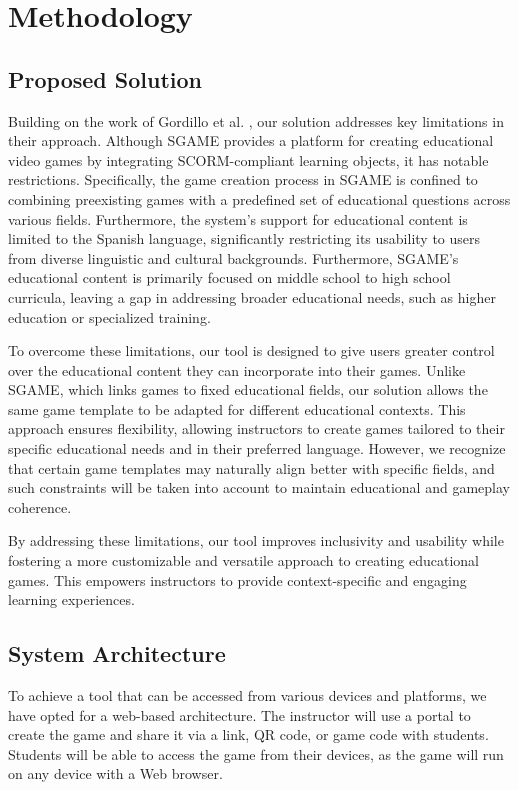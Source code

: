 \chapter{Methodology}\label{chap:method}

\section{Proposed Solution}

Building on the work of Gordillo et al. \cite{sgame2020}, our solution addresses key limitations in their approach. Although SGAME provides a platform for creating educational video games by integrating SCORM-compliant learning objects, it has notable restrictions. Specifically, the game creation process in SGAME is confined to combining preexisting games with a predefined set of educational questions across various fields. Furthermore, the system's support for educational content is limited to the Spanish language, significantly restricting its usability to users from diverse linguistic and cultural backgrounds. Furthermore, SGAME's educational content is primarily focused on middle school to high school curricula, leaving a gap in addressing broader educational needs, such as higher education or specialized training.

To overcome these limitations, our tool is designed to give users greater control over the educational content they can incorporate into their games. Unlike SGAME, which links games to fixed educational fields, our solution allows the same game template to be adapted for different educational contexts. This approach ensures flexibility, allowing instructors to create games tailored to their specific educational needs and in their preferred language. However, we recognize that certain game templates may naturally align better with specific fields, and such constraints will be taken into account to maintain educational and gameplay coherence.

By addressing these limitations, our tool improves inclusivity and usability while fostering a more customizable and versatile approach to creating educational games. This empowers instructors to provide context-specific and engaging learning experiences.

\section{System Architecture}

To achieve a tool that can be accessed from various devices and platforms, we have opted for a web-based architecture. The instructor will use a portal to create the game and share it via a link, QR code, or game code with students. Students will be able to access the game from their devices, as the game will run on any device with a Web browser.

